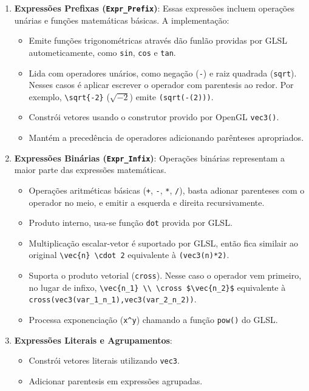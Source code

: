 \begin{enumerate}
    \item \textbf{Expressões Prefixas (\texttt{Expr\_Prefix})}:
    Essas expressões incluem operações unárias e funções matemáticas básicas. A implementação:
    \begin{itemize}
        \item Emite funções trigonométricas através dão funlão providas por GLSL autometicamente, como \verb|sin|, \verb|cos| e \verb|tan|.
        \item Lida com operadores unários, como negação (\verb|-|) e raiz quadrada (\verb|sqrt|). Nesses casos é aplicar escrever o operador com parentesis ao redor. Por exemplo, \verb"\sqrt{-2}" ($\sqrt{-2}$) emite \verb"(sqrt(-(2)))".
        \item Constrói vetores usando o construtor provido por OpenGL \verb|vec3()|.
        \item Mantém a precedência de operadores adicionando parênteses apropriados.
    \end{itemize}

    \item \textbf{Expressões Binárias (\texttt{Expr\_Infix})}:
    Operações binárias representam a maior parte das expressões matemáticas.
    \begin{itemize}
        \item Operações aritméticas básicas (\verb|+|, \verb|-|, \verb|*|, \verb|/|), basta adionar parenteses com o operador no meio, e emitir a esquerda e direita recursivamente.
        \item Produto interno, usa-se função \verb|dot| provida por GLSL.
        \item Multiplicação escalar-vetor é suportado por GLSL, então fica similair ao original \verb"\vec{n} \cdot 2" equivalente à \verb"(vec3(n)*2)".
        \item Suporta o produto vetorial (\verb|cross|). Nesse caso o operador vem primeiro, no lugar de infixo, \verb"\vec{n_1} \\ \cross $\vec{n_2}$" equivalente à  \\ \verb"cross(vec3(var_1_n_1),vec3(var_2_n_2))".
        \item Processa exponenciação (\verb|x^y|) chamando a função \verb|pow()| do GLSL.
    \end{itemize}

    \item \textbf{Expressões Literais e Agrupamentos}:
    \begin{itemize}
        \item Constrói vetores literais utilizando \verb|vec3|.
        \item Adicionar parentesis em expressões agrupadas.
    \end{itemize}


\end{enumerate}
